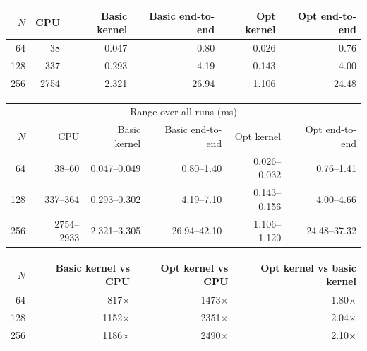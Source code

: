 \documentclass[11pt]{article}
\begin{document}
\begin{center}
\begin{tabular}{rrrrrr}
\toprule
$N$ & CPU & Basic kernel & Basic end-to-end & Opt kernel & Opt end-to-end \\
\midrule
64  & 38  & 0.047  & 0.80  & 0.026  & 0.76 \\
128 & 337 & 0.293 & 4.19 & 0.143 & 4.00 \\
256 & 2754 & 2.321 & 26.94 & 1.106 & 24.48 \\
\bottomrule
\end{tabular}
\end{center}

\begin{center}
\small
\begin{tabular}{rrrrrr}
\toprule
\multicolumn{6}{c}{Range over all runs (ms)} \\
$N$ & CPU & Basic kernel & Basic end-to-end & Opt kernel & Opt end-to-end \\
\midrule
64  & 38--60  & 0.047--0.049  & 0.80--1.40  & 0.026--0.032  & 0.76--1.41 \\
128 & 337--364 & 0.293--0.302 & 4.19--7.10 & 0.143--0.156 & 4.00--4.66 \\
256 & 2754--2933 & 2.321--3.305 & 26.94--42.10 & 1.106--1.120 & 24.48--37.32 \\
\bottomrule
\end{tabular}
\end{center}

\begin{center}
\begin{tabular}{rrrr}
\toprule
$N$ & Basic kernel vs CPU & Opt kernel vs CPU & Opt kernel vs basic kernel \\
\midrule
64  & 817$\times$  & 1473$\times$  & 1.80$\times$ \\
128 & 1152$\times$ & 2351$\times$ & 2.04$\times$ \\
256 & 1186$\times$ & 2490$\times$ & 2.10$\times$ \\
\bottomrule
\end{tabular}
\end{center}
\end{document}
